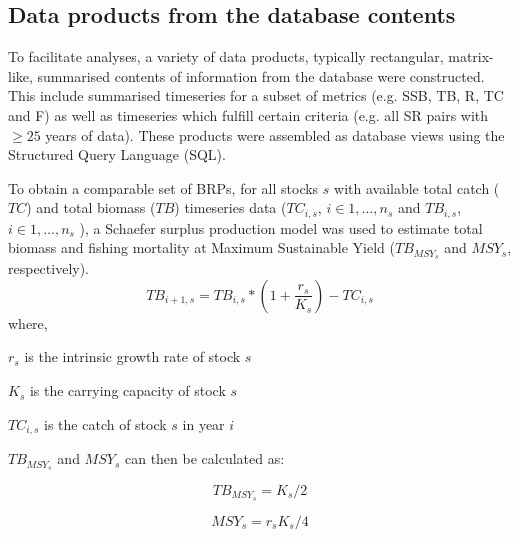 \documentclass[letterpaper,12pt]{article}
\begin{document}
\subsection{Data products from the database contents}
To facilitate analyses, a variety of data products, typically
rectangular, matrix-like, summarised contents of information from the
database were constructed. This include summarised timeseries for a
subset of metrics (e.g. SSB, TB, R, TC and F) as well as timeseries which
fulfill certain criteria (e.g. all SR pairs with $\ge25$ years of
data). These products were assembled as database views using the
Structured Query Language (SQL). %

To obtain a comparable set of BRPs, for all stocks $s$ with available
total catch ($TC$) and total biomass ($TB$) timeseries data ($TC_{i,s}$, $i \in {1,\ldots,n_{s}}$ and 
$TB_{i,s}$, $i \in {1,\ldots,n_{s}}$ ), a Schaefer
surplus production model was used to estimate total biomass and
fishing mortality at Maximum Sustainable Yield ($TB_{MSY_{s}}$ and
$MSY_{s}$, respectively).
\begin{equation}
TB_{i+1,s} = TB_{i,s}*\left(1+\frac{r_{s}}{K_{s}}\right) - TC_{i,s}
\end{equation}
where,
\begin{description}
\item $r_{s}$ is the intrinsic growth rate of stock $s$
\item $K_{s}$ is the carrying capacity of stock $s$
\item $TC_{i,s}$ is the catch of stock $s$ in year $i$
\end{description}

$TB_{MSY_{s}}$ and $MSY_{s}$ can then be calculated as:

\begin{equation}
TB_{MSY_{s}} = K_{s}/2 %
\end{equation}

\begin{equation}
MSY_{s} = r_{s}K_{s}/4
\end{equation}
\end{document}
